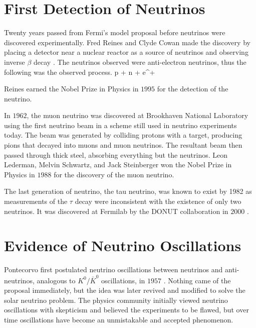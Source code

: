 \section{First Detection of Neutrinos}
\label{sec:1stDetection}

Twenty years passed from Fermi's model proposal before neutrinos were discovered experimentally. Fred Reines and Clyde Cowan made the discovery by placing a detector near a nuclear reactor as a source of neutrinos and observing inverse $\beta$ decay \cite{ref:1953, ref:1956}. The neutrinos observed were anti-electron neutrinos, thus the following was the observed process.
\beq
p + \anue \rightarrow n + e^{+}
\label{eq:BetaInv}
\eeq

\n Reines earned the Nobel Prize in Physics in $1995$ for the detection of the neutrino.

In $1962$, the muon neutrino was discovered at Brookhaven National Laboratory using the first neutrino beam \cite{ref:BNL} in a scheme still used in neutrino experiments today. The beam was generated by colliding protons with a target, producing pions that decayed into muons and muon neutrinos. The resultant beam then passed through thick steel, absorbing everything but the neutrinos. Leon Lederman, Melvin Schwartz, and Jack Steinberger won the Nobel Prize in Physics in $1988$ for the discovery of the muon neutrino.

The last generation of neutrino, the tau neutrino, was known to exist by 1982 \cite{ref:GaryNuTau} as measurements of the $\tau$ decay were inconsistent with the existence of only two neutrinos. It was discovered at Fermilab by the DONUT collaboration in $2000$ \cite{ref:DONUT}.

\section{Evidence of Neutrino Oscillations}
\label{sec:OscHist}

Pontecorvo first postulated neutrino oscillations between neutrinos and anti-neutrinos, analogous to \linebreak$K^0/\bar{K}^0$ oscillations, in $1957$ \cite{ref:Pontecorvo1}. Nothing came of the proposal immediately, but the idea was later revived and modified to solve the solar neutrino problem. The physics community initially viewed neutrino oscillations with skepticism and believed the experiments to be flawed, but over time oscillations have become an unmistakable and accepted phenomenon.

